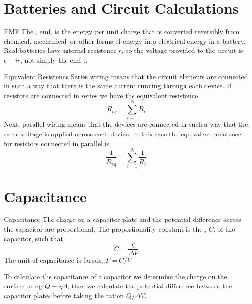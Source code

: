 \documentclass[12pt]{report}
\begin{document}
\section{Batteries and Circuit Calculations}

\begin{defn}{EMF}{}
        The , emf, is the energy per unit charge that is converted reversibly from chemical, mechanical, or other forms of energy into electrical energy in a battery. Real batteries have internel resistence $r$, so the voltage provided to the circuit is $\epsilon -ir$, not simply the emf $\epsilon$.
\end{defn}


\begin{prop}{Equivalent Resistence}{}
        Series wiring means that the circuit elements are connected in such a way that there is the same current running through each device. If resistors are connected in series we have the equivalent resistence \begin{equation}
                R_{eq} = \sum_{i=1}^NR_i
        \end{equation}
        Next, parallel wiring means that the devices are connected in such a way that the same voltage is applied across each device. In this case the equivalent resistence for resistors connected in parallel is \begin{equation}
                \frac{1}{R_{eq}} = \sum_{i=1}^N\frac{1}{R_i}
        \end{equation}
\end{prop}


\section{Capacitance}

\begin{defn}{Capacitance}{}
        The charge on a capacitor plate and the potential difference across the capacitor are proportional. The proportionality constant is the , $C$, of the capacitor, such that \begin{equation}
                C = \frac{q}{\Delta V}
        \end{equation}
        The unit of capacitance is farads, $F = C/V$
\end{defn}


\begin{rmk}{}{}
        To calculate the capacitance of a capacitor we determine the charge on the surface using $Q = \eta A$, then we calculate the potential difference between the capacitor plates before taking the ration $Q/\Delta V$.
\end{rmk}
\end{document}
